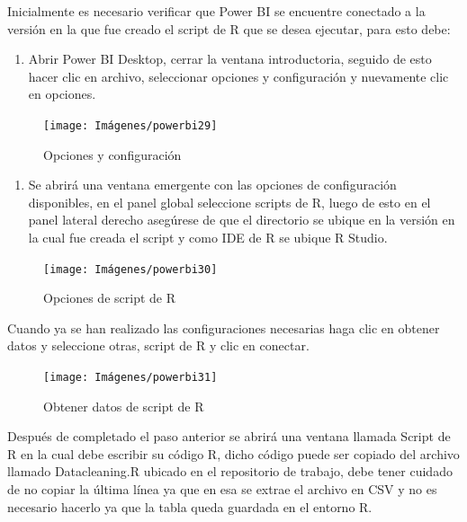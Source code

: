 \documentclass[
]{book}
\providecommand{\tightlist}{%
  \setlength{\itemsep}{0pt}\setlength{\parskip}{0pt}}
\begin{document}
Inicialmente es necesario verificar que Power BI se encuentre conectado a la versión en la que fue creado el script de R que se desea ejecutar, para esto debe:

\begin{enumerate}
\def\labelenumi{\arabic{enumi}.}
\tightlist
\item
  Abrir Power BI Desktop, cerrar la ventana introductoria, seguido de esto hacer clic en archivo, seleccionar opciones y configuración y nuevamente clic en opciones.
\end{enumerate}

\begin{figure}

{\centering \texttt{[image: Imágenes/powerbi29]} 

}

\caption{Opciones y configuración}\label{fig:opcionesyconfiguracion-fig}
\end{figure}

\begin{enumerate}
\def\labelenumi{\arabic{enumi}.}
\setcounter{enumi}{1}
\tightlist
\item
  Se abrirá una ventana emergente con las opciones de configuración disponibles, en el panel global seleccione scripts de R, luego de esto en el panel lateral derecho asegúrese de que el directorio se ubique en la versión en la cual fue creada el script y como IDE de R se ubique R Studio.
\end{enumerate}

\begin{figure}

{\centering \texttt{[image: Imágenes/powerbi30]} 

}

\caption{Opciones de script de R}\label{fig:opcionesyconfiguracionR-fig}
\end{figure}

Cuando ya se han realizado las configuraciones necesarias haga clic en obtener datos y seleccione otras, script de R y clic en conectar.

\begin{figure}

{\centering \texttt{[image: Imágenes/powerbi31]} 

}

\caption{Obtener datos de script de R}\label{fig:obtenerdatosR-fig}
\end{figure}

Después de completado el paso anterior se abrirá una ventana llamada Script de R en la cual debe escribir su código R, dicho código puede ser copiado del archivo llamado Datacleaning.R ubicado en el repositorio de trabajo, debe tener cuidado de no copiar la última línea ya que en esa se extrae el archivo en CSV y no es necesario hacerlo ya que la tabla queda guardada en el entorno R.
\end{document}
